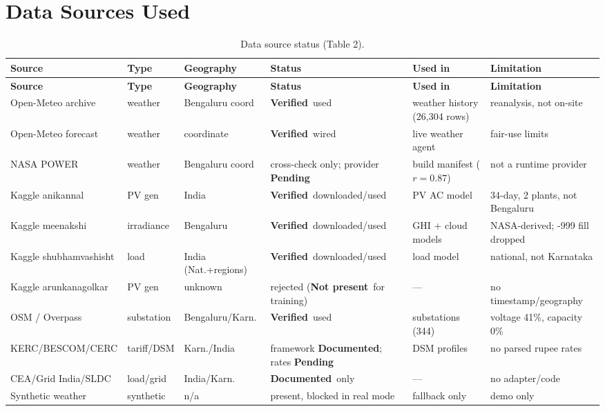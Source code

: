 \documentclass[11pt,a4paper]{article}
\newcommand{\stV}{\textcolor{cok}{\textbf{Verified}}}
\newcommand{\stPend}{\textcolor{cpart}{\textbf{Pending}}}
\newcommand{\stDoc}{\textcolor{cpart}{\textbf{Documented}}}
\newcommand{\stNP}{\textcolor{cmiss}{\textbf{Not present}}}
\begin{document}
\section{Data Sources Used}
\begin{footnotesize}
\begin{longtable}{@{}p{2.5cm}p{1.6cm}p{1.9cm}p{2.4cm}p{2.4cm}p{2.4cm}@{}}
\caption{Data source status (Table 2).}\label{tab:sources}\\
\toprule
\textbf{Source} & \textbf{Type} & \textbf{Geography} & \textbf{Status} & \textbf{Used in} & \textbf{Limitation}\\
\midrule\endfirsthead
\toprule \textbf{Source} & \textbf{Type} & \textbf{Geography} & \textbf{Status} & \textbf{Used in} & \textbf{Limitation}\\ \midrule\endhead
\bottomrule\endfoot
Open-Meteo archive & weather & Bengaluru coord & \stV\ used & weather history (26{,}304 rows) & reanalysis, not on-site\\
Open-Meteo forecast & weather & coordinate & \stV\ wired & live weather agent & fair-use limits\\
NASA POWER & weather & Bengaluru coord & cross-check only; provider \stPend & build manifest ($r=0.87$) & not a runtime provider\\
Kaggle anikannal & PV gen & India & \stV\ downloaded/used & PV AC model & 34-day, 2 plants, not Bengaluru\\
Kaggle meenakshi & irradiance & Bengaluru & \stV\ downloaded/used & GHI + cloud models & NASA-derived; -999 fill dropped\\
Kaggle shubhamvashisht & load & India (Nat.+regions) & \stV\ downloaded/used & load model & national, not Karnataka\\
Kaggle arunkanagolkar & PV gen & unknown & rejected (\stNP\ for training) & --- & no timestamp/geography\\
OSM / Overpass & substation & Bengaluru/Karn. & \stV\ used & substations (344) & voltage 41\%, capacity 0\%\\
KERC/BESCOM/CERC & tariff/DSM & Karn./India & framework \stDoc; rates \stPend & DSM profiles & no parsed rupee rates\\
CEA/Grid India/SLDC & load/grid & India/Karn. & \stDoc\ only & --- & no adapter/code\\
Synthetic weather & synthetic & n/a & present, blocked in real mode & fallback only & demo only\\
\end{longtable}
\end{footnotesize}
\end{document}
